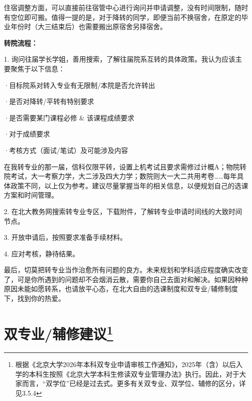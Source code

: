 \vspace{10pt}

住宿调整方面，可以直接前往宿管中心进行询问并申请调整，没有时间限制，随时有空位即可搬。值得一提的是，对于降转的同学，即便当前不换宿舍，在原定的毕业年份时（大三结束后）也需要搬出原宿舍另择宿舍。

\vspace{10pt}

\textbf{转院流程：}

1. 询问往届学长学姐，善用搜索，了解往届院系互转的具体政策。我认为应该主要聚焦于以下信息：

·目标院系对转入专业有无限制/本院是否允许转出

·是否对降转/平转有特别要求

·是否需要某门课程必修 \& 该课程成绩要求

·对于成绩要求

·考核方式（面试/笔试）及可能涉及内容

\vspace{10pt}

在我转专业的那一届，信科仅限平转，设置上机考试且要求需修过计概A；物院转院考试，大一考察力学，大二涉及四大力学；数院则大一大二共用考卷……每年具体政策不同，以上仅为参考。建议尽量掌握当年的相关信息，以便规划自己的选课方案和时间管理。

\vspace{10pt}

2. 在北大教务网搜索转专业专区，下载附件，了解转专业申请时间线的大致时间节点。

\vspace{10pt}

3. 开放申请后，按照要求准备手续材料。

\vspace{10pt}

4. 应对考核，静待结果。

\vspace{10pt}

最后，切莫把转专业当作治愈所有问题的良方。未来规划和学科适应程度确实改变了，可是你所遇到的问题却不会烟消云散，需要你自己去面对和解决。如果因种种原因未能如愿转系，也请放平心态，在北大自由的选课制度和双专业/辅修制度下，找到你的热爱。

\section[双专业/辅修建议]{双专业/辅修建议\footnote{根据《北京大学2026年本科双专业申请审核工作通知》，2025年（含）以后入学的本科生按照《北京大学本科生修读双专业管理办法》执行。因此，对于大家而言，“双学位”已经是过去式。更多有关双专业、双学位、辅修的区分，详见3.5.4}}

